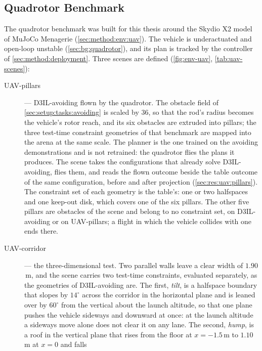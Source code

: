 \FloatBarrier

\subsection{Quadrotor Benchmark}\label{sec:setup:tasks:uav}

The quadrotor benchmark was built for this thesis around the Skydio X2 model of MuJoCo Menagerie
\parencite{zakka2022menagerie} (\autoref{sec:method:env:uav}). The vehicle is underactuated and open-loop
unstable (\autoref{sec:bg:quadrotor}), and its plan is tracked by the controller of
\autoref{sec:method:deployment}. Three scenes are defined
(\autoref{fig:env-uav}, \autoref{tab:uav-scenes}):

\begin{description}
  \item[UAV-pillars] --- D3IL-avoiding flown by the quadrotor. The obstacle field of
    \autoref{sec:setup:tasks:avoiding} is scaled by $36$, so that the rod's radius becomes the vehicle's
    rotor reach, and its six obstacles are extruded into pillars; the three test-time constraint
    geometries of that benchmark are mapped into the arena at the same scale. The planner is the one
    trained on the avoiding demonstrations and is not retrained: the quadrotor flies the plans it
    produces. The scene takes the configurations that already solve D3IL-avoiding, flies them,
    and reads the flown outcome beside the table outcome of the same configuration, before and after
    projection (\autoref{sec:res:uav:pillars}). The constraint set of each geometry is the table's: one or
    two halfspaces and one keep-out disk, which covers one of the six pillars. The other five pillars are
    obstacles of the scene and belong to no constraint set, on D3IL-avoiding or on UAV-pillars; a flight in
    which the vehicle collides with one ends there.
  \item[UAV-corridor] --- the three-dimensional test. Two parallel walls leave a clear width of
    $1.90$\,m, and the scene carries two test-time constraints, evaluated separately, as the geometries
    of D3IL-avoiding are. The first, \emph{tilt}, is a halfspace boundary that slopes by $14^\circ$
    across the corridor in the horizontal plane and is leaned over by $60^\circ$ from the vertical about
    the launch altitude, so that one plane pushes the vehicle sideways and downward at once: at the
    launch altitude a sideways move alone does not clear it on any lane. The second, \emph{hump}, is a
    roof in the vertical plane that rises from the floor at $x=-1.5$\,m to $1.10$\,m at $x=0$ and falls

\end{description}
